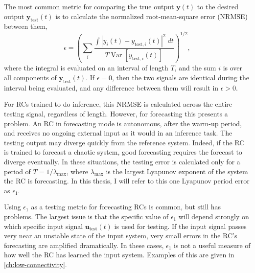The most common metric for comparing the true output $\bm{y}(t)$ to
the desired output $\bm{y}_\text{test}(t)$ is to calculate the
normalized root-mean-square error (NRMSE) between them,
\begin{equation}
  \label{eq:nrmse}
  \epsilon = {\left(\sum_i\frac{\int \left| y_i(t) - y_{\text{test},i}(t) \right|^2 \;dt}{T \operatorname{Var}\left[y_{\text{test},i}(t)\right]}\right)}^{1/2},
\end{equation}
where the integral is evaluated on an interval of length $T$, and the
sum $i$ is over all components of $\bm{y}_\text{test}(t)$.  If
$\epsilon = 0$, then the two signals are identical during the interval
being evaluated, and any difference between them will result in
$\epsilon > 0$.

For RCs trained to do inference, this NRMSE is calculated across the
entire testing signal, regardless of length. However, for forecasting
this presents a problem. An RC in forecasting mode is autonomous,
after the warm-up period, and receives no ongoing external input as it
would in an inference task. The testing output may diverge quickly
from the reference system. Indeed, if the RC is trained to forecast a
chaotic system, good forecasting requires the forecast to diverge
eventually. In these situations, the testing error is calculated only
for a period of $T = 1/\lambda_\text{max}$, where $\lambda_\text{max}$
is the largest Lyapunov exponent of the system the RC is
forecasting. In this thesis, I will refer to this one Lyapunov period
error as $\epsilon_1$.

Using $\epsilon_1$ as a testing metric for forecasting RCs is common,
but still has problems.\cite{pathak2017,haluszczynski2019} The largest
issue is that the specific value of $\epsilon_1$ will depend strongly
on which specific input signal $\bm{u}_\text{test}(t)$ is used for
testing. If the input signal passes very near an unstable state of the
input system, very small errors in the RC's forecasting are amplified
dramatically. In these cases, $\epsilon_1$ is not a useful measure of
how well the RC has learned the input system. Examples of this are
given in \cref{ch:low-connectivity}.

